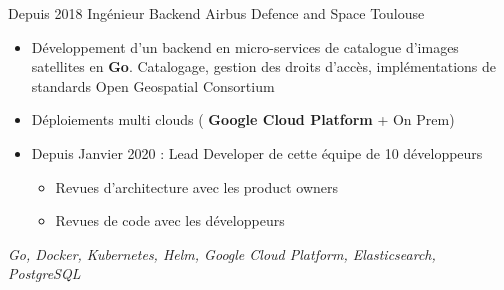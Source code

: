 \cventry
    {Depuis 2018}
    {Ingénieur Backend}
    {}
    {Airbus Defence and Space}
    {Toulouse}
    {
        \begin{itemize}
            \item Développement d'un backend en micro-services de catalogue d'images satellites en \textbf{Go}. Catalogage, gestion des droits d'accès, implémentations de standards Open Geospatial Consortium
            \item Déploiements multi clouds ( \textbf{Google Cloud Platform} + On Prem)
            \item Depuis Janvier 2020 : Lead Developer de cette équipe de 10 développeurs
            \begin{itemize}
                \item Revues d'architecture avec les product owners
                \item Revues de code avec les développeurs
            \end{itemize}
        \end{itemize}
        \textit{Go, Docker, Kubernetes, Helm, Google Cloud Platform, Elasticsearch, PostgreSQL}
    }
\vspace*{0.2cm}
